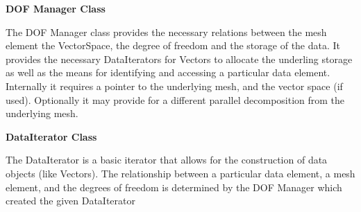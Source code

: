 \documentclass[10pt]{article}
\begin{document}
\vspace{6 mm}\noindent\textbf{DOF Manager Class}

The DOF Manager class provides the necessary relations between the mesh element the VectorSpace, the degree of freedom and the storage of the data.  It provides the necessary DataIterators for Vectors to allocate the underling storage as well as the means for identifying and accessing a particular data element.  Internally it requires a pointer to the underlying mesh, and the vector space (if used).  Optionally it may provide for a different parallel decomposition from the underlying mesh.



\vspace{6 mm}\noindent\textbf{DataIterator Class}

The DataIterator is a basic iterator that allows for the construction of data objects (like Vectors).  The relationship between a particular data element, a mesh element, and the degrees of freedom is determined by the DOF Manager which created the given DataIterator
\end{document}
